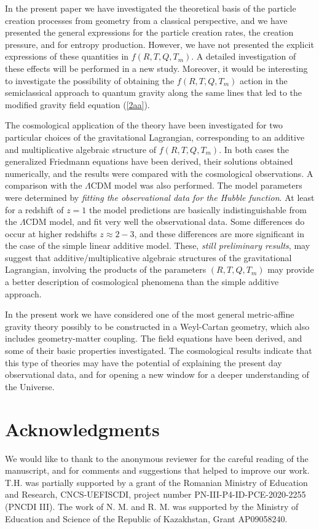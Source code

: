 \documentclass[aps,superscriptaddress, showpacs,preprintnumbers, superscriptaddress, nofootinbibt,twocolumn]{revtex4}
\begin{document}
In the present paper we have investigated the theoretical basis of the particle creation processes from geometry from a classical perspective, and we have presented the general expressions for the particle creation rates, the creation pressure, and for entropy production. However, we have not presented the explicit expressions of these quantities in $f\left(R,T,Q,T_m\right)$. A detailed investigation of these effects will be performed in a new study. Moreover, it would be interesting to investigate the possibility of obtaining the $f\left(R,T,Q,T_m\right)$ action in the semiclassical approach to quantum gravity along the same lines that led to the modified gravity field equation (\ref{2aa}).  

The cosmological application of the theory have been investigated for two particular choices of the gravitational Lagrangian, corresponding to an additive and multiplicative algebraic structure of $f\left(R,T,Q,T_m\right)$. In both cases the generalized Friedmann equations have been derived, their solutions obtained numerically, and the results were compared with the cosmological observations. A comparison with the $\Lambda$CDM model was also performed. The model parameters were determined by {\it fitting the observational data for the Hubble function}. At least for a redshift of $z=1$ the model predictions are basically indistinguishable from the $\Lambda$CDM model, and fit very well the observational data. Some differences do occur at higher redshifts $z\approx 2-3$,  and these differences are more significant in the case of the simple linear additive model. These, {\it still preliminary results}, may suggest that additive/multiplicative algebraic structures of the gravitational Lagrangian, involving the products of the parameters $\left(R,T,Q,T_m\right)$ may provide a better description of cosmological phenomena than the simple additive approach.

In the present work we have considered one of the most general metric-affine gravity theory possibly to be constructed in a Weyl-Cartan geometry, which also includes geometry-matter coupling. The field equations have been derived, and some of their basic properties investigated. The cosmological results indicate that this type of theories may have the potential of explaining the present day observational data, and for opening a new window for a deeper understanding of the Universe.



\section*{Acknowledgments}
We would like to thank to the anonymous reviewer for the careful reading of the manuscript, and for comments and suggestions that helped to improve our work. T.H. was partially supported by a grant of the Romanian Ministry of Education and Research, CNCS-UEFISCDI, project number PN-III-P4-ID-PCE-2020-2255 (PNCDI III). The work of N. M. and R. M. was  supported by the Ministry of Education and Science of the Republic of Kazakhstan, Grant  AP09058240.
\end{document}
